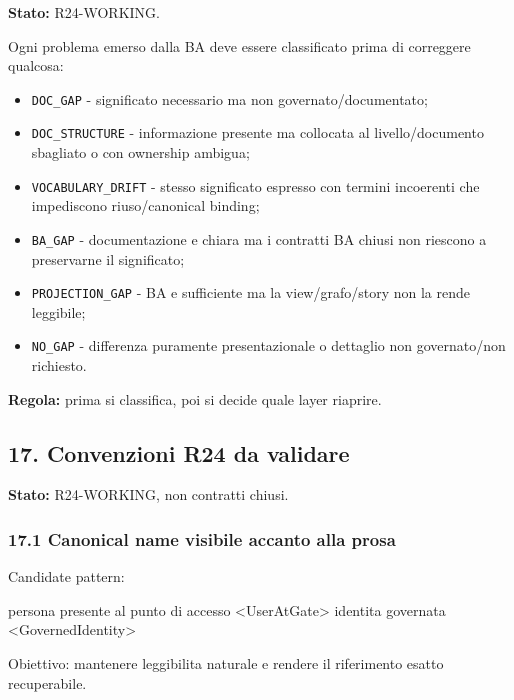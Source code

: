 \documentclass[
  9pt,
  a4paper,
]{article}
\newenvironment{Shaded}{}{}
\newcommand{\NormalTok}[1]{#1}
\providecommand{\tightlist}{%
  \setlength{\itemsep}{0pt}\setlength{\parskip}{0pt}}
\begin{document}
\textbf{Stato:} R24-WORKING.

Ogni problema emerso dalla BA deve essere classificato prima di
correggere qualcosa:

\begin{itemize}
\tightlist
\item
  \texttt{DOC\_GAP} - significato necessario ma non
  governato/documentato;
\item
  \texttt{DOC\_STRUCTURE} - informazione presente ma collocata al
  livello/documento sbagliato o con ownership ambigua;
\item
  \texttt{VOCABULARY\_DRIFT} - stesso significato espresso con termini
  incoerenti che impediscono riuso/canonical binding;
\item
  \texttt{BA\_GAP} - documentazione e chiara ma i contratti BA chiusi
  non riescono a preservarne il significato;
\item
  \texttt{PROJECTION\_GAP} - BA e sufficiente ma la view/grafo/story non
  la rende leggibile;
\item
  \texttt{NO\_GAP} - differenza puramente presentazionale o dettaglio
  non governato/non richiesto.
\end{itemize}

\textbf{Regola:} prima si classifica, poi si decide quale layer
riaprire.

\subsection{17. Convenzioni R24 da
validare}\label{convenzioni-r24-da-validare}

\textbf{Stato:} R24-WORKING, non contratti chiusi.

\subsubsection{17.1 Canonical name visibile accanto alla
prosa}\label{canonical-name-visibile-accanto-alla-prosa}

Candidate pattern:

\begin{Shaded}
\begin{Highlighting}[]
\NormalTok{persona presente al punto di accesso \textless{}UserAtGate\textgreater{}}
\NormalTok{identita governata \textless{}GovernedIdentity\textgreater{}}
\end{Highlighting}
\end{Shaded}

Obiettivo: mantenere leggibilita naturale e rendere il riferimento
esatto recuperabile.
\end{document}
